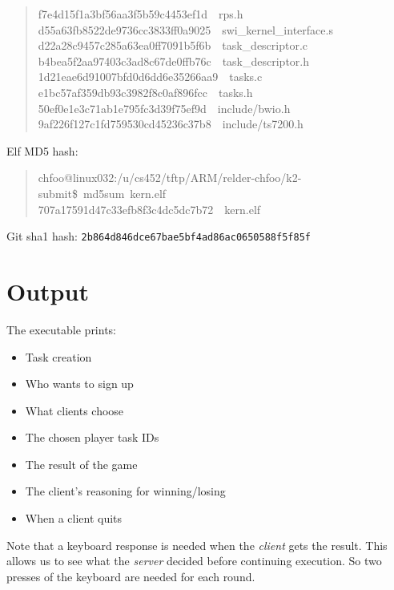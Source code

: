 \documentclass[letterpaper, 11pt]{article}
\begin{document}
\begin{quote}
{f7e4d15f1a3bf56aa3f5b59c4453ef1d~~rps.h\\
d55a63fb8522de9736cc3833ff0a9025~~swi\_kernel\_interface.s\\
d22a28c9457c285a63ea0ff7091b5f6b~~task\_descriptor.c\\
b4bea5f2aa97403c3ad8c67de0ffb76c~~task\_descriptor.h\\
1d21eae6d91007bfd0d6dd6e35266aa9~~tasks.c\\
e1bc57af359db93c3982f8c0af896fcc~~tasks.h\\
50ef0e1e3c71ab1e795fc3d39f75ef9d~~include/bwio.h\\
9af226f127c1fd759530cd45236c37b8~~include/ts7200.h
}
\end{quote}

Elf MD5 hash:
%
\begin{quote}{\ttfamily \raggedright \noindent
chfoo@linux032:/u/cs452/tftp/ARM/relder-chfoo/k2-submit\$~md5sum~kern.elf\\
707a17591d47c33efb8f3c4dc5dc7b72~~kern.elf
}
\end{quote}

Git sha1 hash: \texttt{2b864d846dce67bae5bf4ad86ac0650588f5f85f}


\section{Output%
  \label{output}%
}

The executable prints:
%
\begin{itemize}

\item Task creation

\item Who wants to sign up

\item What clients choose

\item The chosen player task IDs

\item The result of the game

\item The client's reasoning for winning/losing

\item When a client quits

\end{itemize}

Note that a keyboard response is needed when the \emph{client} gets the result. This allows us to see what the \emph{server} decided before continuing execution. So two presses of the keyboard are needed for each round.
\end{document}
